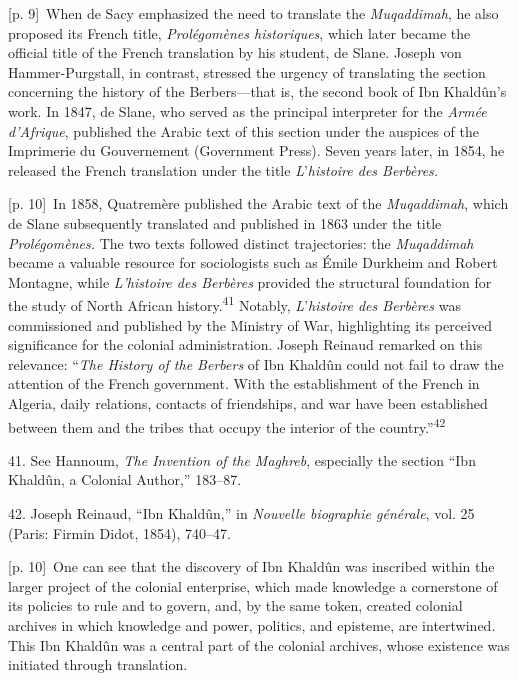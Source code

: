 \documentclass[10pt,a4paper]{article}
\begin{document}
{\scriptsize\color{gray} [p. 9]}\ When de Sacy emphasized the need to translate the \textit{Muqaddimah}, he also proposed its French title, \textit{Prolégomènes historiques}, which later became the official title of the French translation by his student, de Slane. Joseph von Hammer-Purgstall, in contrast, stressed the urgency of translating the section concerning the history of the Berbers—that is, the second book of Ibn Khaldûn’s work. In 1847, de Slane, who served as the principal interpreter for the \textit{Armée d’Afrique}, published the Arabic text of this section under the auspices of the Imprimerie du Gouvernement (Government Press). Seven years later, in 1854, he released the French translation under the title \textit{L}’\textit{histoire des Berbères.}\par
{\scriptsize\color{gray} [p. 10]}\ In 1858, Quatremère published the Arabic text of the \textit{Muqaddimah}, which de Slane subsequently translated and published in 1863 under the title \textit{Prolégomènes.} The two texts followed distinct trajectories: the \textit{Muqaddimah} became a valuable resource for sociologists such as Émile Durkheim and Robert Montagne, while \textit{L’histoire des Berbères} provided the structural foundation for the study of North African history.\nobreak\textsuperscript{41} Notably, \textit{L}’\textit{histoire des Berbères} was commissioned and published by the Ministry of War, highlighting its perceived significance for the colonial administration. Joseph Reinaud remarked on this relevance: “\textit{The History of the Berbers} of Ibn Khaldûn could not fail to draw the attention of the French government. With the establishment of the French in Algeria, daily relations, contacts of friendships, and war have been established between them and the tribes that occupy the interior of the country.”\nobreak\textsuperscript{42}\par{\small 41. See Hannoum, \textit{The Invention of the Maghreb}, especially the section “Ibn Khaldûn, a Colonial Author,” 183–87.\par}{\small 42. Joseph Reinaud, “Ibn Khaldûn,” in \textit{Nouvelle biographie générale}, vol. 25 (Paris: Firmin Didot, 1854), 740–47.\par}
{\scriptsize\color{gray} [p. 10]}\ One can see that the discovery of Ibn Khaldûn was inscribed within the larger project of the colonial enterprise, which made knowledge a cornerstone of its policies to rule and to govern, and, by the same token, created colonial archives in which knowledge and power, politics, and episteme, are intertwined. This Ibn Khaldûn was a central part of the colonial archives, whose existence was initiated through translation.\par
\end{document}
